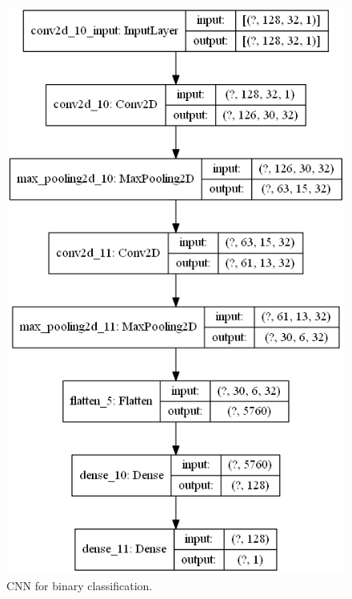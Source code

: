 \documentclass{article}
\begin{document}
\begin{figure}
   \centering
    \includegraphics[totalheight=16cm]{circle_id/binary/model.png}
  \caption{\label{fig:binary_model} CNN for binary classification.}
\end{figure}
%
\end{document}

